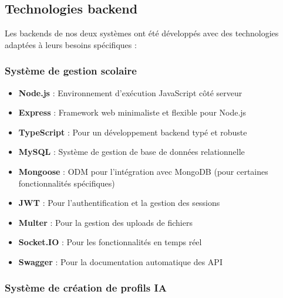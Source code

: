 \subsection{Technologies backend}

Les backends de nos deux systèmes ont été développés avec des technologies adaptées à leurs besoins spécifiques :

\subsubsection{Système de gestion scolaire}

\begin{itemize}
  \item \textbf{Node.js} : Environnement d'exécution JavaScript côté serveur
  
  \item \textbf{Express} : Framework web minimaliste et flexible pour Node.js
  
  \item \textbf{TypeScript} : Pour un développement backend typé et robuste
  
  \item \textbf{MySQL} : Système de gestion de base de données relationnelle
  
  \item \textbf{Mongoose} : ODM pour l'intégration avec MongoDB (pour certaines fonctionnalités spécifiques)
  
  \item \textbf{JWT} : Pour l'authentification et la gestion des sessions
  
  \item \textbf{Multer} : Pour la gestion des uploads de fichiers
  
  \item \textbf{Socket.IO} : Pour les fonctionnalités en temps réel
  
  \item \textbf{Swagger} : Pour la documentation automatique des API
\end{itemize}

\subsubsection{Système de création de profils IA}

